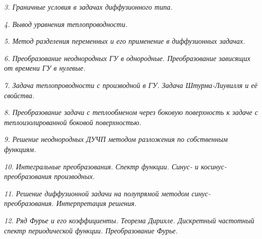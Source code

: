 \newpage %

\emph{3. Граничные условия в задачах диффузионного типа.}

\newpage %

\emph{4. Вывод уравнения теплопроводности.}

\newpage %

\emph{5. Метод разделения переменных и его применение в диффузионных задачах.}

\newpage %

\emph{6. Преобразование неоднородных ГУ в однородные. Преобразование зависящих
от времени ГУ в нулевые.}

\newpage %

\emph{7. Задача теплопроводности с производной в ГУ. Задача Штурма-Лиувилля и её
свойства.}

\newpage %

\emph{8. Преобразование задачи с теплообменом через боковую поверхность к задаче
с теплоизолированной боковой поверхностью.}

\newpage %

\emph{9. Решение неоднородных ДУЧП методом разложения по собственным функциям.}

\newpage %

\emph{10. Интегральные преобразования. Спектр функции. Синус- и
косинус-преобразования производных.}

\newpage %

\emph{11. Решение диффузионной задачи на полупрямой методом
синус-преобразования. Интерпретация решения.}

\newpage %

\emph{12. Ряд Фурье и его коэффициенты. Теорема Дирихле. Дискретный частотный
спектр периодической функции. Преобразование Фурье.}

\newpage %

